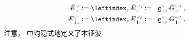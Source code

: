 \begin{subequations} \label{eq:amp_eigenmode}
	\begin{align}
		\Xint{\mathcolor{gray}{-}}{30}{\bar{E}}^{\;\!\mathcolor{gray}{\omega}}_{\;\! \mathcolor{gray}{z}} &:= \leftindex_{\textcolor{PineGreen}{\jmath}} \;\! \Xint{\mathcolor{gray}{-}}{30}{\bar{E}}^{\;\!\mathcolor{gray}{\omega} \textcolor{PineGreen}{\jmath}}_{\;\! \mathcolor{gray}{z}} := \Xint{\begin{smallmatrix} ~ \\ {}^{}_{\mathcolor{gray}{-}} \\ ~ \end{smallmatrix}}{09}{\mathtt{g}}^{\;\!\mathcolor{gray}{\omega}}_{\;\! \mathcolor{gray}{z} \textcolor{PineGreen}{\jmath}} \Xint{\mathcolor{gray}{-}}{20}{\bar{G}}^{\;\!\mathcolor{gray}{\omega} \textcolor{PineGreen}{\jmath}}_{\;\! \mathcolor{gray}{z}} ~, \label{eq:vec-amp_eigenmode} \\
		\Xint{\mathcolor{gray}{-}}{30}{E}^{\;\!\mathcolor{gray}{\omega}}_{\;\! \hat{1} \mathcolor{gray}{z}} &:= \leftindex_{\textcolor{PineGreen}{\jmath}} \;\! \Xint{\mathcolor{gray}{-}}{30}{E}^{\;\!\mathcolor{gray}{\omega} \textcolor{PineGreen}{\jmath}}_{\;\! \hat{1} \mathcolor{gray}{z}} := \Xint{\begin{smallmatrix} ~ \\ {}^{}_{\mathcolor{gray}{-}} \\ ~ \end{smallmatrix}}{09}{\mathtt{g}}^{\;\!\mathcolor{gray}{\omega}}_{\;\! \mathcolor{gray}{z} \textcolor{PineGreen}{\jmath}} \Xint{\mathcolor{gray}{-}}{20}{G}^{\;\!\mathcolor{gray}{\omega} \textcolor{PineGreen}{\jmath}}_{\;\! \hat{1} \mathcolor{gray}{z}} ~, \label{eq:components-amp_eigenmode}
	\end{align}
\end{subequations}
注意， 中均隐式地定义了\textcolor{PineGreen}{本征波}
